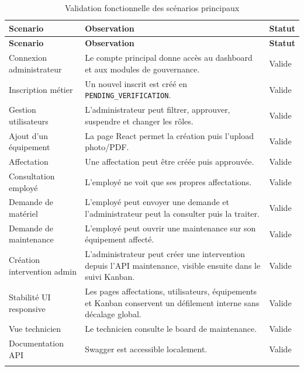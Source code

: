 \begin{longtable}{p{4.5cm}p{7.5cm}p{2.2cm}}
\caption{Validation fonctionnelle des scénarios principaux}\\
\toprule
\textbf{Scenario} & \textbf{Observation} & \textbf{Statut} \\
\midrule
\endfirsthead
\toprule
\textbf{Scenario} & \textbf{Observation} & \textbf{Statut} \\
\midrule
\endhead
Connexion administrateur & Le compte principal donne accès au dashboard et aux modules de gouvernance. & Valide \\
Inscription métier & Un nouvel inscrit est créé en \texttt{PENDING\_VERIFICATION}. & Valide \\
Gestion utilisateurs & L'administrateur peut filtrer, approuver, suspendre et changer les rôles. & Valide \\
Ajout d'un équipement & La page React permet la création puis l'upload photo/PDF. & Valide \\
Affectation & Une affectation peut être créée puis approuvée. & Valide \\
Consultation employé & L'employé ne voit que ses propres affectations. & Valide \\
Demande de matériel & L'employé peut envoyer une demande et l'administrateur peut la consulter puis la traiter. & Valide \\
Demande de maintenance & L'employé peut ouvrir une maintenance sur son équipement affecté. & Valide \\
Création intervention admin & L'administrateur peut créer une intervention depuis l'API maintenance, visible ensuite dans le suivi Kanban. & Valide \\
Stabilité UI responsive & Les pages affectations, utilisateurs, équipements et Kanban conservent un défilement interne sans décalage global. & Valide \\
Vue technicien & Le technicien consulte le board de maintenance. & Valide \\
Documentation API & Swagger est accessible localement. & Valide \\
\bottomrule
\label{tab:validation-fonctionnelle}
\end{longtable}

